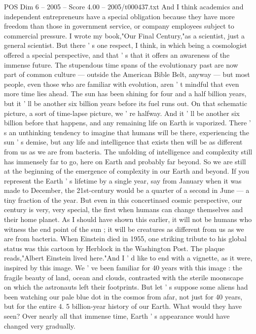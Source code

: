 \begin{textsample}{POS Dim 6 – 2005 – Score 4.00 – 2005/t000437.txt}
And I think academics and independent entrepreneurs have a special obligation because they have more freedom than those in government service, or company employees subject to commercial pressure.
I wrote my book,"Our Final Century,"as a scientist, just a general scientist.
But there ' s one respect, I think, in which being a cosmologist offered a special perspective, and that ' s that it offers an awareness of the immense future.
The stupendous time spans of the evolutionary past are now part of common culture — outside the American Bible Belt, anyway — but most people, even those who are familiar with evolution, aren ' t mindful that even more time lies ahead.
The sun has been shining for four and a half billion years, but it ' ll be another six billion years before its fuel runs out.
On that schematic picture, a sort of time-lapse picture, we ' re halfway.
And it ' ll be another six billion before that happens, and any remaining life on Earth is vaporized.
There ' s an unthinking tendency to imagine that humans will be there, experiencing the sun ' s demise, but any life and intelligence that exists then will be as different from us as we are from bacteria.
The unfolding of intelligence and complexity still has immensely far to go, here on Earth and probably far beyond.
So we are still at the beginning of the emergence of complexity in our Earth and beyond.
If you represent the Earth ' s lifetime by a single year, say from January when it was made to December, the 21st-century would be a quarter of a second in June — a tiny fraction of the year.
But even in this concertinaed cosmic perspective, our century is very, very special, the first when humans can change themselves and their home planet.
As I should have shown this earlier, it will not be humans who witness the end point of the sun ; it will be creatures as different from us as we are from bacteria.
When Einstein died in 1955, one striking tribute to his global status was this cartoon by Herblock in the Washington Post.
The plaque reads,"Albert Einstein lived here."And I ' d like to end with a vignette, as it were, inspired by this image.
We ' ve been familiar for 40 years with this image : the fragile beauty of land, ocean and clouds, contrasted with the sterile moonscape on which the astronauts left their footprints.
But let ' s suppose some aliens had been watching our pale blue dot in the cosmos from afar, not just for 40 years, but for the entire 4. 5 billion-year history of our Earth.
What would they have seen?
Over nearly all that immense time, Earth ' s appearance would have changed very gradually.

\end{textsample}
